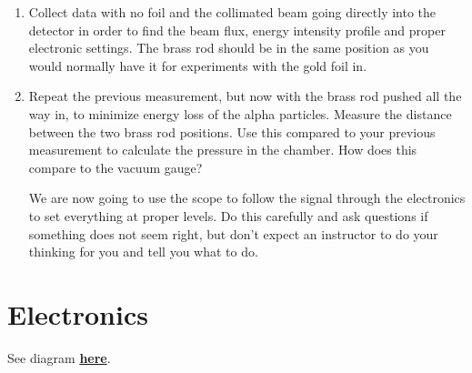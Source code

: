 \documentclass{../lab}
\begin{document}
\begin{enumerate}
    \item Collect data with no foil and the collimated beam going directly into the detector in order to find the beam flux, energy intensity profile and proper electronic settings. The brass rod should be in the same position as you would normally have it for experiments with the gold foil in.

    \item Repeat the previous measurement, but now with the brass rod pushed all the way in, to minimize energy loss of the alpha particles. Measure the distance between the two brass rod positions. Use this compared to your previous measurement to calculate the pressure in the chamber. How does this compare to the vacuum gauge?


We are now going to use the scope to follow the signal through the electronics to set everything at proper levels. Do this carefully and ask questions if something does not seem right, but don't expect an instructor to do your thinking for you and tell you what to do.

\end{enumerate}

\section{Electronics}

See diagram \href{https://drive.google.com/file/d/1BQr9hTb3EG87-nMeZURuU5lBJU4uHPfE/view?usp=drive_link}{\textbf{here}}.
\end{document}
